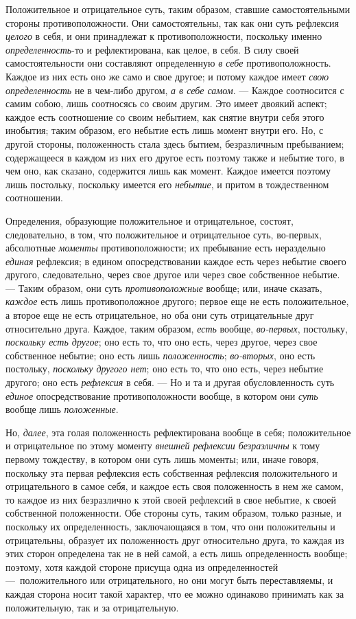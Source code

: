 Положительное и отрицательное суть, таким образом, ставшие самостоятельными
стороны противоположности. Они самостоятельны, так как они суть рефлексия
{\em целого} в себя, и они принадлежат к
противоположности, поскольку именно
{\em определенность}{}-то и рефлектирована, как целое,
в себя. В силу своей самостоятельности они составляют определенную
{\em в себе} противоположность. Каждое из них есть оно
же само и свое другое; и потому каждое имеет {\em свою
определенность} не в чем-либо другом, {\em а в себе
самом}. — Каждое соотносится с самим собою, лишь соотносясь со своим
другим. Это имеет двоякий аспект; каждое есть соотношение со своим
небытием, как снятие внутри себя этого инобытия; таким образом, его небытие
есть лишь момент внутри его. Но, с другой стороны, положенность стала здесь
бытием, безразличным пребыванием; содержащееся в каждом из них его другое
есть поэтому также и небытие того, в чем оно, как сказано, содержится лишь
как момент. Каждое имеется поэтому лишь постольку, поскольку имеется его
{\em небытие}, и притом в тождественном соотношении.

Определения, образующие положительное и отрицательное, состоят,
следовательно, в том, что положительное и отрицательное суть, во-первых,
абсолютные {\em моменты} противоположности; их
пребывание есть нераздельно {\em единая} рефлексия; в
едином опосредствовании каждое есть через небытие своего другого,
следовательно, через свое другое или через свое собственное небытие. —
Таким образом, они суть {\em противоположные} вообще;
или, иначе сказать, {\em каждое} есть лишь
противоположное другого; первое еще не есть положительное, а второе еще не
есть отрицательное, но оба они суть отрицательные друг относительно друга.
Каждое, таким образом, {\em есть} вообще,
{\em во-первых}, постольку,
{\em поскольку есть другое}; оно есть то, что оно есть,
через другое, через свое собственное небытие; оно есть лишь
{\em положенность};
{\em во-вторых}, оно есть постольку,
{\em поскольку другого нет}; оно есть то, что оно есть,
через небытие другого; оно есть {\em рефлексия} в себя.
— Но и та и другая обусловленность суть {\em единое}
опосредствование противоположности вообще, в котором они
{\em суть} вообще лишь
{\em положенные}.

Но, {\em далее}, эта голая положенность рефлектирована
вообще в себя; положительное и отрицательное по этому моменту
{\em внешней рефлексии безразличны} к тому первому
тождеству, в котором они суть лишь моменты; или, иначе говоря, поскольку
эта первая рефлексия есть собственная рефлексия положительного и
отрицательного в самое себя, и каждое есть своя положенность в нем же
самом, то каждое из них безразлично к этой своей рефлексий в свое небытие,
к своей собственной положенности. Обе стороны суть, таким образом, только
разные, и поскольку их определенность, заключающаяся в том, что они
положительны и отрицательны, образует их положенность друг относительно
друга, то каждая из этих сторон определена так не в ней самой, а есть лишь
определенность вообще; поэтому, хотя каждой стороне присуща одна из
определенностей —~положительного или отрицательного, но они могут быть
переставляемы, и каждая сторона носит такой характер, что ее можно
одинаково принимать как за положительную, так и за отрицательную.

